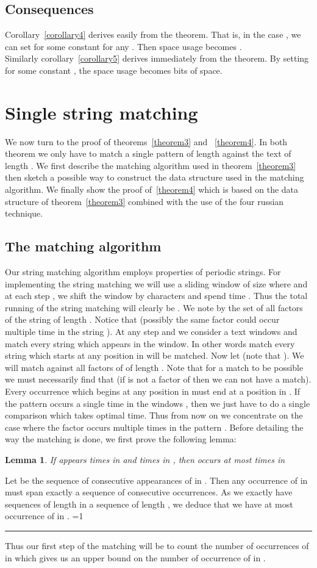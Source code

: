 \documentclass{article}
\newcommand{\?}{\mskip1.5mu}
\newcounter{noqed}
\newcommand{\qed}{ \ifmmode\mbox{
}\fi\rule[-.05em]{.3em}{.7em}\setcounter{noqed}{0}}
\newenvironment{proof}[1][{}]{\noindent{\bf Proof#1.
}\setcounter{noqed}{1}}{\ifnum\value{noqed}=1\qed\fi\par\medskip}
\newtheorem{lemma}{Lemma}
\begin{document}
\subsection{Consequences}
Corollary~\ref{corollary4} derives easily from the theorem. That is, in the case , we can set  for some constant  for any . Then space usage becomes .
\\
Similarly corollary~\ref{corollary5} derives immediately from the theorem. By setting  for some constant , the space usage becomes  bits of space.

\section{Single string matching}
We now turn to the proof of theorems~\ref{theorem3} and ~\ref{theorem4}. In both theorem we only have to match a single pattern  of length  against the text  of length . We first describe the matching algorithm used in theorem~\ref{theorem3} then sketch a possible way to construct the data structure used in the matching algorithm. We finally show the proof of~\ref{theorem4} which is based on the data structure of theorem~\ref{theorem3} combined with the use of the four russian technique.
\subsection{The matching algorithm}
Our string matching algorithm employs properties of periodic strings. For implementing the string matching we will use a sliding window of size  where  and at each step , we shift the window by  characters and spend time . Thus the total running of the string matching will clearly be . We note by  the set of all factors of the string  of length . Notice that  (possibly the same factor  could occur multiple time in the string  ). 
At any step  and we consider a text windows  and match every string which appears in the window. In other words match every string which starts at any position in  will be matched. Now let  (note that ). We will match  against all factors of  of length . Note that for a match to be possible we must necessarily find that  (if  is not a factor of  then we can not have a match). Every occurrence which begins at any position in  must end at a position in . 
If the pattern  occurs a single time in the windows , then we just have to do a single comparison which takes optimal time. Thus from now on we concentrate on the case where the factor  occurs multiple times in the pattern . Before detailing the way the matching is done, we first prove the following lemma:
\begin{lemma}
\label{lemma:substr_count}
If  appears  times in  and  times in , then  occurs at most  times in 
\end{lemma}
\begin{proof}
Let  be the sequence of consecutive appearances of  in . Then any occurrence of  in  must span exactly a sequence of  consecutive occurrences. As we exactly have  sequences of length  in a sequence of length , we deduce that we have at most  occurrence of  in . 
\end{proof}
Thus our first step of the matching will be to count the number of occurrences of  in  which gives us an upper bound on the number of occurrence of  in . 
\end{document}
